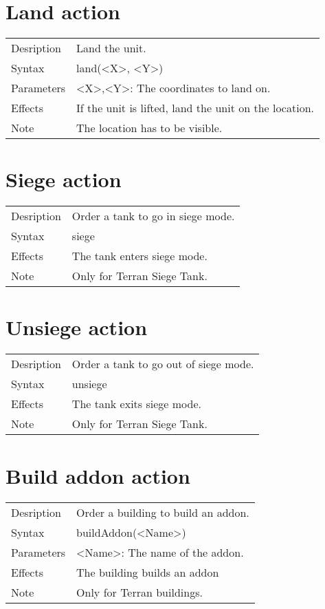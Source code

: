 \documentclass[english,11pt]{report}
\begin{document}
\section{Land action}
\begin{tabularx}{\textwidth}{lX}
 Desription & Land the unit. \\
 Syntax & land(<X>, <Y>) \\
 Parameters & <X>,<Y>: The coordinates to land on.\\
 Effects &  If the unit is lifted, land the unit on the location.\\
 Note & The location has to be visible.
\end{tabularx}

\section{Siege action}
\begin{tabularx}{\textwidth}{lX}
 Desription & Order a tank to go in siege mode. \\
 Syntax & siege \\
 Effects &  The tank enters siege mode.\\
 Note & Only for Terran Siege Tank.
\end{tabularx}

\section{Unsiege action}
\begin{tabularx}{\textwidth}{lX}
 Desription & Order a tank to go out of siege mode. \\
 Syntax & unsiege \\
 Effects &  The tank exits siege mode.\\
 Note & Only for Terran Siege Tank.
\end{tabularx}

\section{Build addon action}
\begin{tabularx}{\textwidth}{lX}
 Desription & Order a building to build an addon. \\
 Syntax & buildAddon(<Name>) \\
 Parameters & <Name>: The name of the addon.\\
 Effects &  The building builds an addon\\
 Note & Only for Terran buildings.
\end{tabularx}
\end{document}
